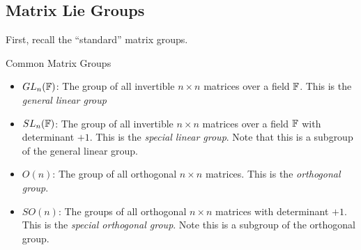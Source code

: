\subsection{Matrix Lie Groups}
First, recall the ``standard'' matrix groups.
\begin{boxdef}{Common Matrix Groups}{}
    \begin{itemize}
        \item $GL_n(\mathbb{F})$: The group of all invertible $n \times n$ matrices over
        a field $\mathbb{F}$. This is the \textit{general linear group}
        \item $SL_n(\mathbb{F})$: The group of all invertible $n \times n$ matrices over
        a field $\mathbb{F}$ with determinant $+1$. This is the \textit{special linear group}.
        Note that this is a subgroup of the general linear group.
        \item $O(n)$: The group of all orthogonal $n\times n$ matrices. This is the
        \textit{orthogonal group}.
        \item $SO(n)$: The groups of all orthogonal $n\times n$ matrices with determinant
        $+1$. This is the \textit{special orthogonal group}. Note this is a subgroup
        of the orthogonal group.
    \end{itemize}
\end{boxdef}


